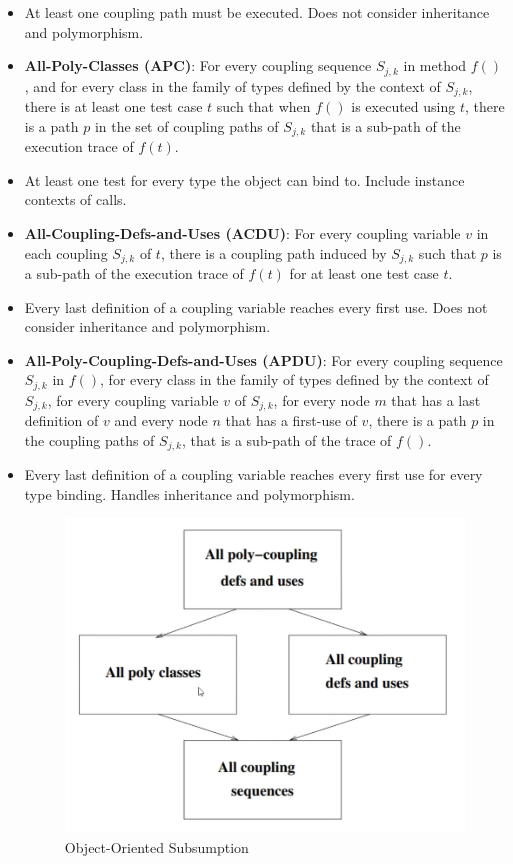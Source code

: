 \documentclass[a4paper]{article}
\begin{document}
\begin{itemize}
    \item At least one coupling path must be executed. Does not consider inheritance and polymorphism.
    \item \textbf{All-Poly-Classes (APC)}: For every coupling sequence $S_{j,k}$ in method $f()$, and for every class in the family of types defined by the context of $S_{j,k}$, there is at least one test case $t$ such that when $f()$ is executed using $t$, there is a path $p$ in the set of coupling paths of $S_{j,k}$ that is a sub-path of the execution trace of $f(t)$.
    \item At least one test for every type the object can bind to. Include instance contexts of calls.
    \item \textbf{All-Coupling-Defs-and-Uses (ACDU)}: For every coupling variable $v$ in each coupling $S_{j,k}$ of $t$, there is a coupling path induced by $S_{j,k}$ such that $p$ is a sub-path of the execution trace of $f(t)$ for at least one test case $t$.
    \item Every last definition of a coupling variable reaches every first use. Does not consider inheritance and polymorphism.
    \item \textbf{All-Poly-Coupling-Defs-and-Uses (APDU)}: For every coupling sequence $S_{j,k}$ in $f()$, for every class in the family of types defined by the context of $S_{j,k}$, for every coupling variable $v$ of $S_{j,k}$, for every node $m$ that has a last definition of $v$ and every node $n$ that has a first-use of $v$, there is a path $p$ in the coupling paths of $S_{j,k}$, that is a sub-path of the trace of $f()$.
    \item Every last definition of a coupling variable reaches every first use for every type binding. Handles inheritance and polymorphism.
    \begin{figure}[H]
        \centering
        \includegraphics[width=0.5\linewidth]{Degree//static/ST_OO_subsumption.png}
        \caption{Object-Oriented Subsumption}
    \end{figure}
\end{itemize}
\end{document}
